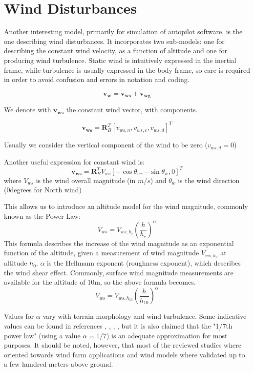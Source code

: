 \section{Wind Disturbances}
Another interesting model, primarily for simulation of autopilot software, is the one describing wind disturbances. It incorporates two sub-models: one for describing the constant wind velocity, as a function of altitude and one for producing wind turbulence. Static wind is intuitively expressed in the inertial frame, while turbulence is usually expressed in the body frame, so care is required in order to avoid confusion and errors in notation and coding.

\begin{equation}
	\bm{v_w} = \bm{v_{ws}} + \bm{v_{wg}}
\end{equation}

We denote with $\bm{v_{ws}}$ the constant wind vector, with components.

\begin{equation}
\bm{v_{ws}} = \bm{R}_B^T[v_{ws,n}, v_{ws,e}, v_{ws,d}]^T
\end{equation}

Usually we consider the vertical component of the wind to be zero ($v_{ws,d}=0$)

Another useful expression for constant wind is:
\begin{equation}
\bm{v_{ws}} = \bm{R}_B^TV_{ws}[-\cos\theta_w, -\sin\theta_w, 0]^T
\end{equation}
where $V_{ws}$ is the wind overall magnitude (in $m/s$) and $\theta_w$ is the wind direction (0degrees for North wind)

This allows us to introduce an altitude model for the wind magnitude, commonly known as the Power Law:
\begin{equation}
V_{ws} = V_{ws,h_r} \left(\frac{h}{h_r}\right)^\alpha
\end{equation}
This formula describes the increase of the wind magnitude as an exponential function of the altitude, given a measurement of wind magnitude $V_{ws,h_0}$ at altitude $h_0$. $\alpha$ is the Hellmann exponent (roughness exponent), which describes the wind shear effect. Commonly, surface wind magnitude measurements are available for the altitude of 10m, so the above formula becomes.
\begin{equation}
V_{ws} = V_{ws,h_10} \left(\frac{h}{h_10}\right)^\alpha
\end{equation}

Values for $\alpha$ vary with terrain morphology and wind turbulence. Some indicative values can be found in references \cite{Banuelos-Ruedas2011}, \cite{Peterson1978}, \cite{wiki:WindGrad}, \cite{wiki:Wind_profile_power_law}, but it is also claimed that the "1/7th power law" (using a value $\alpha=1/7$) is an adequate approximation for most purposes.
It should be noted, however, that most of the reviewed studies where oriented towards wind farm applications and wind models where validated up to a few hundred meters above ground.

